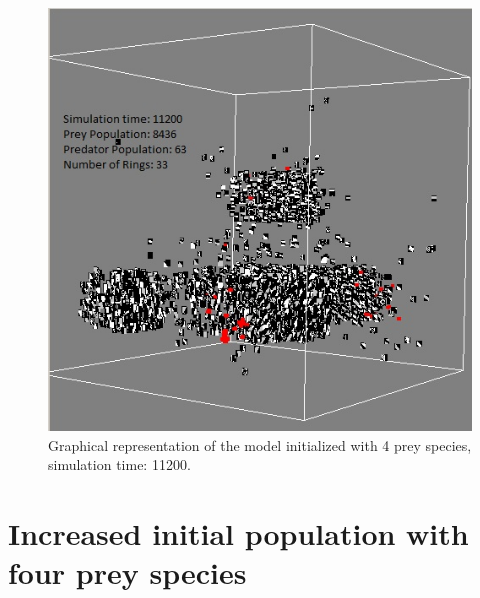 \begin{figure}[H]
	\centering
	\label{fig:screenshot-simTime11K-4Prey}
	\includegraphics[scale=0.55]{images/simTime11K-4Prey}
	\caption{Graphical representation of the model initialized with 4 prey species, simulation time: 11200.}
\end{figure}

\section{Increased initial population with four prey species}

